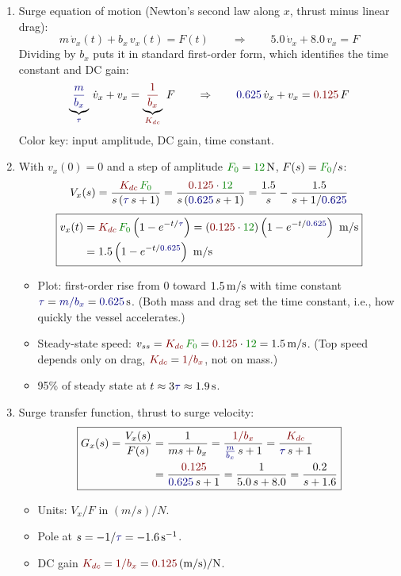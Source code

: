 \documentclass[11pt]{article}
\newcommand{\Fin}[1]{\textcolor{green!50!black}{#1}}  %
\newcommand{\Kdc}[1]{\textcolor{red!50!black}{#1}}    %
\newcommand{\Tc}[1]{\textcolor{blue!50!black}{#1}}    %
\begin{document}
\begin{enumerate}[start=6]

\item Surge equation of motion (Newton's second law along $x$, thrust minus linear drag):
\[
  \boxed{m\,\dot{v}_x(t) + b_x\,v_x(t) = F(t)}
  \qquad\Rightarrow\qquad
  5.0\,\dot{v}_x + 8.0\,v_x = F
\]
Dividing by $b_x$ puts it in standard first-order form, which identifies the time constant and DC gain:
\[
  \underbrace{\Tc{\frac{m}{b_x}}}_{\Tc{\tau}}\,\dot{v}_x + v_x = \underbrace{\Kdc{\frac{1}{b_x}}}_{\Kdc{K_{dc}}}\,F
  \qquad\Rightarrow\qquad
  \Tc{0.625}\,\dot{v}_x + v_x = \Kdc{0.125}\,F
\]
Color key: \Fin{input amplitude}, \Kdc{DC gain}, \Tc{time constant}.

\item With $v_x(0) = 0$ and a step of amplitude $\Fin{F_0} = \unit[\Fin{12}]{N}$, $F(s) = \Fin{F_0}/s$:
\[
  V_x(s) = \frac{\Kdc{K_{dc}}\,\Fin{F_0}}{s\,(\Tc{\tau}\,s + 1)} = \frac{\Kdc{0.125}\cdot\Fin{12}}{s\,(\Tc{0.625}\,s + 1)} = \frac{1.5}{s} - \frac{1.5}{s + 1/\Tc{0.625}}
\]
\[
  \boxed{\begin{aligned}
    v_x(t) &= \Kdc{K_{dc}}\,\Fin{F_0}\left(1 - e^{-t/\Tc{\tau}}\right) = (\Kdc{0.125}\cdot\Fin{12})\left(1 - e^{-t/\Tc{0.625}}\right)\ \unit{m/s} \\
           &= 1.5\left(1 - e^{-t/\Tc{0.625}}\right)\ \unit{m/s}
  \end{aligned}}
\]
\begin{itemize}[nosep]
  \item Plot: first-order rise from 0 toward $\unit[1.5]{m/s}$ with time constant $\Tc{\tau} = \Tc{m/b_x} = \unit[\Tc{0.625}]{s}$.  (Both mass and drag set the time constant, i.e., how quickly the vessel accelerates.)
  \item Steady-state speed: $v_{ss} = \Kdc{K_{dc}}\,\Fin{F_0} = \Kdc{0.125}\cdot\Fin{12} = \unit[1.5]{m/s}$.  (Top speed depends only on drag, $\Kdc{K_{dc}} = \Kdc{1/b_x}$, not on mass.)
  \item 95\% of steady state at $t \approx 3\Tc{\tau} \approx \unit[1.9]{s}$.
\end{itemize}

\item Surge transfer function, thrust to surge velocity:
\[
  \boxed{\begin{aligned}
    G_x(s) = \frac{V_x(s)}{F(s)} &= \frac{1}{m s + b_x} = \frac{\Kdc{1/b_x}}{\Tc{\frac{m}{b_x}}\,s + 1} = \frac{\Kdc{K_{dc}}}{\Tc{\tau}\,s + 1} \\
                                 &= \frac{\Kdc{0.125}}{\Tc{0.625}\,s + 1} = \frac{1}{5.0\,s + 8.0} = \frac{0.2}{s + 1.6}
  \end{aligned}}
\]
\begin{itemize}[nosep]
  \item Units: $V_x/F$ in $\unit{(m/s)/N}$.
  \item Pole at $s = -1/\Tc{\tau} = \unit[-1.6]{s^{-1}}$.
  \item DC gain $\Kdc{K_{dc}} = \Kdc{1/b_x} = \unit[\Kdc{0.125}]{(m/s)/N}$.
\end{itemize}


\end{enumerate}
\end{document}
